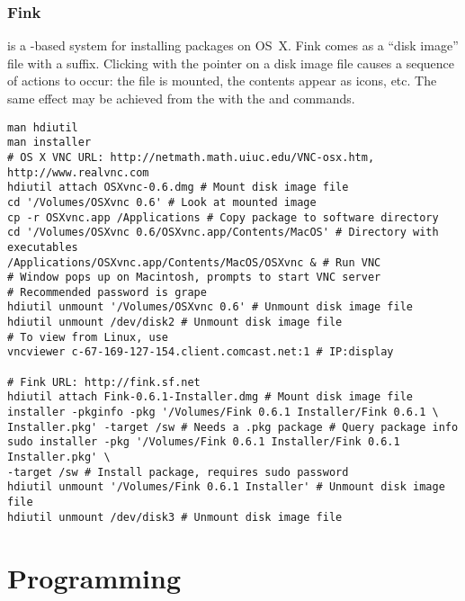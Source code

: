 \documentclass[12pt,twoside]{article}
\begin{document}
\subsubsection{Fink}
 is a -based system for installing
packages on OS~X.
Fink comes as a ``disk image'' file with a  suffix.
Clicking with the pointer on a disk image file causes a sequence of
actions to occur: the file is mounted, the contents appear as icons,
etc.
The same effect may be achieved from the  with
the  and  commands.
\begin{verbatim}
man hdiutil
man installer
# OS X VNC URL: http://netmath.math.uiuc.edu/VNC-osx.htm, http://www.realvnc.com
hdiutil attach OSXvnc-0.6.dmg # Mount disk image file
cd '/Volumes/OSXvnc 0.6' # Look at mounted image
cp -r OSXvnc.app /Applications # Copy package to software directory
cd '/Volumes/OSXvnc 0.6/OSXvnc.app/Contents/MacOS' # Directory with executables
/Applications/OSXvnc.app/Contents/MacOS/OSXvnc & # Run VNC
# Window pops up on Macintosh, prompts to start VNC server
# Recommended password is grape
hdiutil unmount '/Volumes/OSXvnc 0.6' # Unmount disk image file
hdiutil unmount /dev/disk2 # Unmount disk image file
# To view from Linux, use
vncviewer c-67-169-127-154.client.comcast.net:1 # IP:display

# Fink URL: http://fink.sf.net
hdiutil attach Fink-0.6.1-Installer.dmg # Mount disk image file
installer -pkginfo -pkg '/Volumes/Fink 0.6.1 Installer/Fink 0.6.1 \
Installer.pkg' -target /sw # Needs a .pkg package # Query package info
sudo installer -pkg '/Volumes/Fink 0.6.1 Installer/Fink 0.6.1 Installer.pkg' \
-target /sw # Install package, requires sudo password
hdiutil unmount '/Volumes/Fink 0.6.1 Installer' # Unmount disk image file
hdiutil unmount /dev/disk3 # Unmount disk image file
\end{verbatim}

\section{Programming}\label{sxn:prg}
\end{document}
